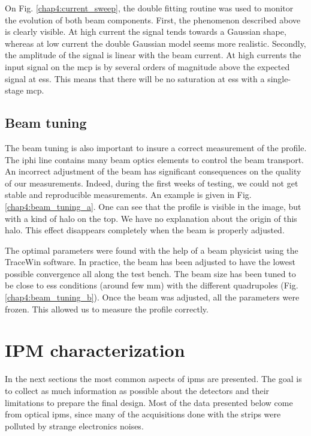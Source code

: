 \begin{refsection}
  

  On Fig. \ref{chap4:current_sweep}, the double fitting routine was used to monitor the evolution of both beam components. First, the phenomenon described above is clearly visible. At high current the signal tends towards a Gaussian shape, whereas at low current the double Gaussian model seems more realistic. Secondly, the amplitude of the signal is linear with the beam current. At high currents the input signal on the \acrshort{mcp} is by several orders of magnitude above the expected signal at \acrshort{ess}. This means that there will be no saturation at \acrshort{ess} with a single-stage \acrshort{mcp}.

  \subsection{Beam tuning}

  The beam tuning is also important to insure a correct measurement of the profile. The \acrshort{iphi} line contains many beam optics elements to control the beam transport. An incorrect adjustment of the beam has significant consequences on the quality of our measurements. Indeed, during the first weeks of testing, we could not get stable and reproducible measurements. An example is given in Fig. \ref{chap4:beam_tuning_a}. One can see that the profile is visible in the image, but with a kind of halo on the top. We have no explanation about the origin of this halo. This effect disappears completely when the beam is properly adjusted.

  The optimal parameters were found with the help of a beam physicist using the TraceWin software. In practice, the beam has been adjusted to have the lowest possible convergence all along the test bench. The beam size has been tuned to be close to \acrshort{ess} conditions (around few $\mathrm{mm}$) with the different quadrupoles (Fig. \ref{chap4:beam_tuning_b}). Once the beam was adjusted, all the parameters were frozen. This allowed us to measure the profile correctly.

  


  \section{IPM characterization}
  In the next sections the most common aspects of \acrshort{ipm}s are presented. The goal is to collect as much information as possible about the detectors and their limitations to prepare the final design. Most of the data presented below come from optical \acrshort{ipm}s, since many of the acquisitions done with the strips were polluted by strange electronics noises.


\end{refsection}
